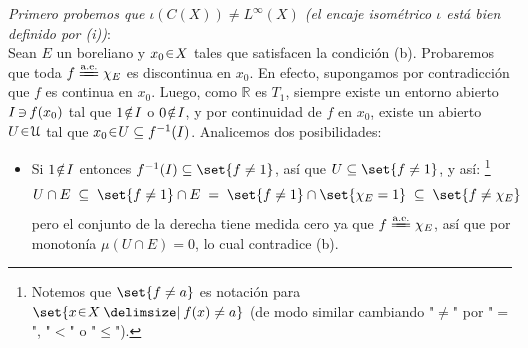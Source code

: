 \begin{sol}
\begin{enumerate}[label = (\roman*), leftmargin=1.8em]
\emph{Primero probemos que $\iota(C(X)) \neq L^\infty(X)$ (el encaje isométrico $\iota$ está bien definido por (i))}:\\
Sean $E$ un boreliano y $x_0 \en X$ tales que satisfacen la condición (b). 
Probaremos que toda $f \ctpeq \chi_E$ es discontinua en $x_0$. En efecto, supongamos por contradicción que $f$ es continua en $x_0$. Luego, como $\mathbb{R}$ es $T_1$, siempre existe un entorno abierto $I \operatorname{\ni} f(x_0)$ tal que $1 \noten I$ o $0 \noten I$, y por continuidad de $f$ en $x_0$, existe un abierto $U\en\mathcal{U}$ tal que $x_0 \en U \subseteq f^{-1}(I)$. Analicemos dos posibilidades:
\begin{itemize}[leftmargin = 1em]
    \item Si $1\noten I$ entonces $f^{-1}(I) \subseteq \set{f \neq 1}$, así que $U \subseteq \set{f\neq 1}$, y así:%
    \footnote{
    Notemos que $\set{f \neq a}$ es notación para $\set{x \en X \given f(x) \neq a}$ (de modo similar cambiando "$\neq$" por "$=$", "$<$" o "$\leq$").
    }
    \[
    U \cap E 
    \;\subseteq\; \set{f \neq 1} \cap E
    \;=\; \set{f\neq1} \cap \set{\chi_E = 1}
    \;\subseteq\; \set{f \neq \chi_E}
    \]
    pero el conjunto de la derecha tiene medida cero ya que $f \ctpeq \chi_E$, así que por monotonía $\mu(U \cap E) = 0$, lo cual contradice (b).


\end{itemize}
\end{enumerate}
\end{sol}
